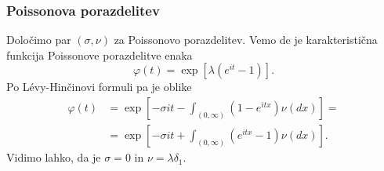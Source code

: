 \documentclass[]{beamer} %
\theoremstyle{plain}
\begin{document}
\begin{frame}
  \frametitle{Poissonova porazdelitev}
  Določimo par $(\sigma, \nu)$ za Poissonovo porazdelitev.
  \pause
  Vemo de je karakteristična funkcija Poissonove porazdelitve enaka
  $$
  \varphi(t) = \exp\left[\lambda(e^{it} - 1)\right].
  $$
  \pause
  Po Lévy-Hinčinovi formuli pa je oblike 
  \begin{align*}
  \varphi(t) &= \exp\left[-\sigma it - \int_{(0, \infty)}(1 - e^{itx})\nu(dx)\right]= \\
             &= \exp\left[-\sigma it + \int_{(0, \infty)}(e^{itx} - 1)\nu(dx)\right].
  \end{align*}
  \pause
  Vidimo lahko, da je $\sigma = 0$ in $\nu = \lambda \delta_1$.
\end{frame}
\end{document}
